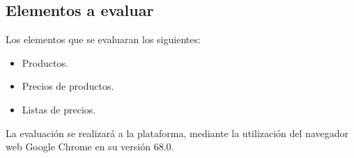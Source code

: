 
\subsection{Elementos a evaluar}
Los elementos que se evaluaran los siguientes:

\begin{itemize}
\item Productos.
\item Precios de productos.
\item Listas de precios.
\end{itemize}

La evaluación se realizará a la plataforma, mediante la utilización del navegador
web Google Chrome en su versión 68.0.

